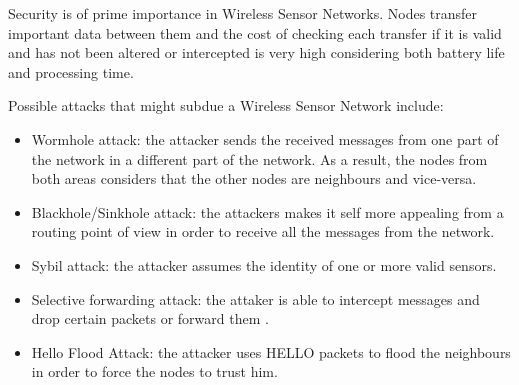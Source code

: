 Security is of prime importance in Wireless Sensor Networks. Nodes transfer important data between
them and the cost of checking each transfer if it is valid and has not been altered or intercepted
is very high considering both battery life and processing time.

Possible attacks that might subdue a Wireless Sensor Network include:
\begin{itemize}

\item Wormhole attack: the attacker sends the received messages from one part of the network in a different part of the network. As a result, the nodes from both areas considers that the other nodes are neighbours and vice-versa.
\item Blackhole/Sinkhole attack: the attackers makes it self more appealing from a routing point of view in order to receive all the messages from the network.
\item Sybil attack: the attacker assumes the identity of one or more valid sensors\cite{newsome2004sybil}.
\item Selective forwarding attack: the attaker is able to intercept messages and drop certain packets or forward them \cite{kaplantzis2007detecting}.
\item Hello Flood Attack: the attacker uses HELLO packets to flood the neighbours in order to force the nodes to trust him.

\end{itemize}

